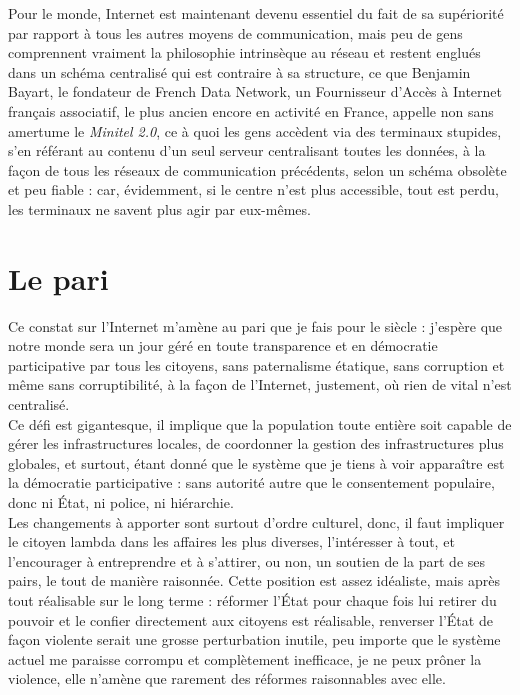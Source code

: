 \documentclass[12pt,a4paper]{article}
\begin{document}
{Pour le monde, Internet est maintenant devenu essentiel du fait de sa supériorité par rapport à tous les autres moyens de communication, mais peu de gens comprennent vraiment la philosophie intrinsèque au réseau et restent englués dans un schéma centralisé qui est contraire à sa structure, ce que Benjamin Bayart, le fondateur de French Data Network, un Fournisseur d'Accès à Internet français associatif, le plus ancien encore en activité en France, appelle non sans amertume le \emph{Minitel 2.0}, ce à quoi les gens accèdent via des terminaux stupides, s'en référant au contenu d'un seul serveur centralisant toutes les données, à la façon de tous les réseaux de communication précédents, selon un schéma obsolète et peu fiable : car, évidemment, si le centre n'est plus accessible, tout est perdu, les terminaux ne savent plus agir par eux-mêmes.\\

\part{Le pari}

Ce constat sur l'Internet m'amène au pari que je fais pour le siècle : j'espère que notre monde sera un jour géré en toute transparence et en démocratie participative par tous les citoyens, sans paternalisme étatique, sans corruption et même sans corruptibilité, à la façon de l'Internet, justement, où rien de vital n'est centralisé.\\

Ce défi est gigantesque, il implique que la population toute entière soit capable de gérer les infrastructures locales, de coordonner la gestion des infrastructures plus globales, et surtout, étant donné que le système que je tiens à voir apparaître est la démocratie participative : sans autorité autre que le consentement populaire, donc ni État, ni police, ni hiérarchie.\\

Les changements à apporter sont surtout d'ordre culturel, donc, il faut impliquer le citoyen lambda dans les affaires les plus diverses, l'intéresser à tout, et l'encourager à entreprendre et à s'attirer, ou non, un soutien de la part de ses pairs, le tout de manière raisonnée. Cette position est assez idéaliste, mais après tout réalisable sur le long terme : réformer l'État pour chaque fois lui retirer du pouvoir et le confier directement aux citoyens est réalisable, renverser l'État de façon violente serait une grosse perturbation inutile, peu importe que le système actuel me paraisse corrompu et complètement inefficace, je ne peux prôner la violence, elle n'amène que rarement des réformes raisonnables avec elle.\\

}
\end{document}
